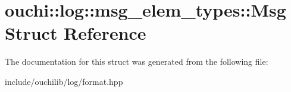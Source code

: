 \hypertarget{structouchi_1_1log_1_1msg__elem__types_1_1_msg}{}\section{ouchi\+::log\+::msg\+\_\+elem\+\_\+types\+::Msg Struct Reference}
\label{structouchi_1_1log_1_1msg__elem__types_1_1_msg}


The documentation for this struct was generated from the following file\+:\begin{DoxyCompactItemize}
\item 
include/ouchilib/log/format.\+hpp\end{DoxyCompactItemize}
